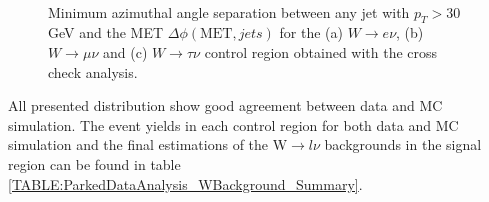 \begin{figure}[!htb]
\centering
{}
 \\
\caption{Minimum azimuthal angle separation between any jet with $p_{T}>30$ GeV and the \gls{MET} $\Delta\phi(\text{MET},jets)$ for the (a) $W\rightarrow e\nu$, (b) $W\rightarrow\mu\nu$ and (c) $W\rightarrow\tau\nu$ control region obtained with the cross check analysis.}
\label{FIGURE:ParkedDataAnalysis_WBackground_MinDeltaPhi}
\end{figure}

All presented distribution show good agreement between data and \gls{MC} simulation. The event yields in each control region for both data and \gls{MC} simulation and the final estimations of the W$\rightarrow l\nu$ backgrounds in the signal region can be found in table \ref{TABLE:ParkedDataAnalysis_WBackground_Summary}.
 
